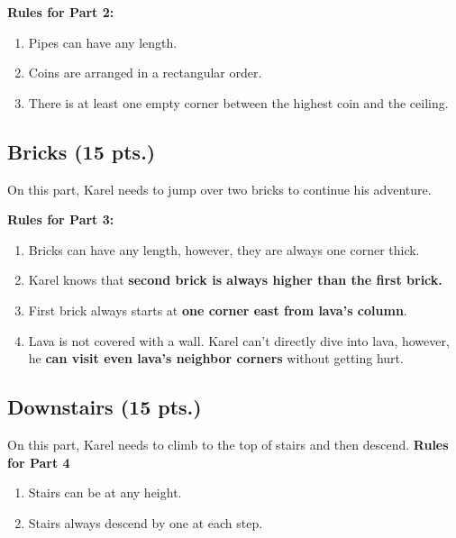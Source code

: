\documentclass[a4paper]{article}
\begin{document}
\textbf{Rules for Part 2:}
\begin{enumerate}
\item Pipes can have any length.
\item Coins are arranged in a rectangular order.
\item There is at least one empty corner between the highest coin and the ceiling.
\\
\end{enumerate}


\subsection{Bricks (15 pts.)}
\noindent On this part, Karel needs to jump over two bricks to continue his adventure.


\textbf{Rules for Part 3:}
\begin{enumerate}
\item Bricks can have any length, however, they are always one corner thick.
\item Karel knows that \textbf{second brick is always higher than the first brick.}
\item First brick always starts at \textbf{one corner east from lava's column}.
\item Lava is not covered with a wall. Karel can't directly dive into lava, however, he \textbf{can visit even lava's neighbor corners} without getting hurt. 
\\
\end{enumerate}


\subsection{Downstairs (15 pts.)}


On this part, Karel needs to climb to the top of stairs and then descend.
\newline
\newline
\textbf{Rules for Part 4}
\begin{enumerate}
\item Stairs can be at any height.
\item Stairs always descend by one at each step.
\end{enumerate}
\end{document}
